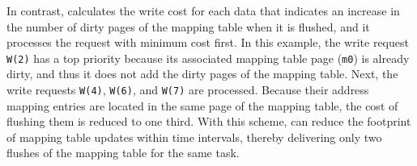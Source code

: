 In contrast, \ours{} calculates the write cost for each data that indicates an
increase in the number of dirty pages of the mapping table when it is flushed,
and it processes the request with minimum cost first.  In this example, the
write request \texttt{W(2)} has a top priority because its associated mapping
table page (\texttt{m0}) is already dirty, and thus it does not add the dirty
pages of the mapping table.  Next, the write requests \texttt{W(4)},
\texttt{W(6)}, and \texttt{W(7)} are processed.  Because their address mapping
entries are located in the same page of the mapping table, the cost of flushing
them is reduced to one third.  With this scheme, \ours{} can reduce the footprint
of mapping table updates within time intervals, thereby delivering only two
flushes of the mapping table for the same task. 

\iffalse
